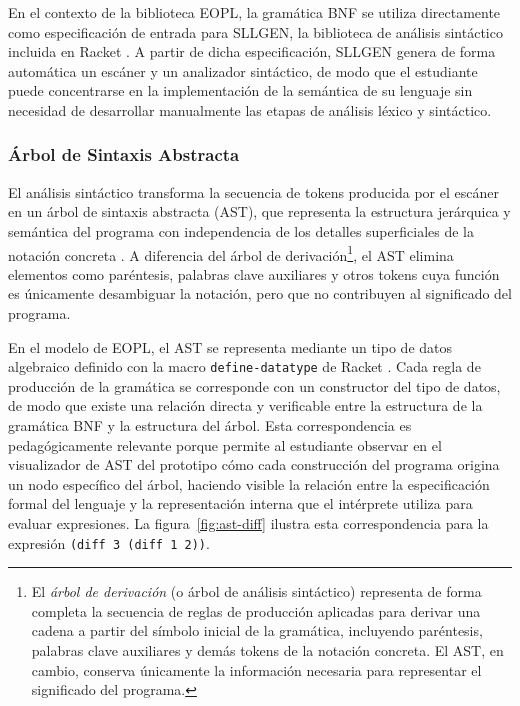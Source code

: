 En el contexto de la biblioteca EOPL, la gramática BNF se utiliza directamente como especificación de entrada para SLLGEN, la biblioteca de análisis sintáctico incluida en Racket \cite{Friedman2008EPL}. A partir de dicha especificación, SLLGEN genera de forma automática un escáner y un analizador sintáctico, de modo que el estudiante puede concentrarse en la implementación de la semántica de su lenguaje sin necesidad de desarrollar manualmente las etapas de análisis léxico y sintáctico.

\subsubsection{Árbol de Sintaxis Abstracta}
\label{sec:ast}

El análisis sintáctico transforma la secuencia de tokens producida por el escáner en un árbol de sintaxis abstracta (AST), que representa la estructura jerárquica y semántica del programa con independencia de los detalles superficiales de la notación concreta \cite{aho2006compilers}. A diferencia del árbol de derivación\footnote{El \textit{árbol de derivación} (o árbol de análisis sintáctico) representa de forma completa la secuencia de reglas de producción aplicadas para derivar una cadena a partir del símbolo inicial de la gramática, incluyendo paréntesis, palabras clave auxiliares y demás tokens de la notación concreta. El AST, en cambio, conserva únicamente la información necesaria para representar el significado del programa.}, el AST elimina elementos como paréntesis, palabras clave auxiliares y otros tokens cuya función es únicamente desambiguar la notación, pero que no contribuyen al significado del programa.

En el modelo de EOPL, el AST se representa mediante un tipo de datos algebraico definido con la macro \texttt{define-datatype} de Racket \cite{Friedman2008EPL}. Cada regla de producción de la gramática se corresponde con un constructor del tipo de datos, de modo que existe una relación directa y verificable entre la estructura de la gramática BNF y la estructura del árbol. Esta correspondencia es pedagógicamente relevante porque permite al estudiante observar en el visualizador de AST del prototipo cómo cada construcción del programa origina un nodo específico del árbol, haciendo visible la relación entre la especificación formal del lenguaje y la representación interna que el intérprete utiliza para evaluar expresiones. La figura~\ref{fig:ast-diff} ilustra esta correspondencia para la expresión \texttt{(diff 3 (diff 1 2))}.

